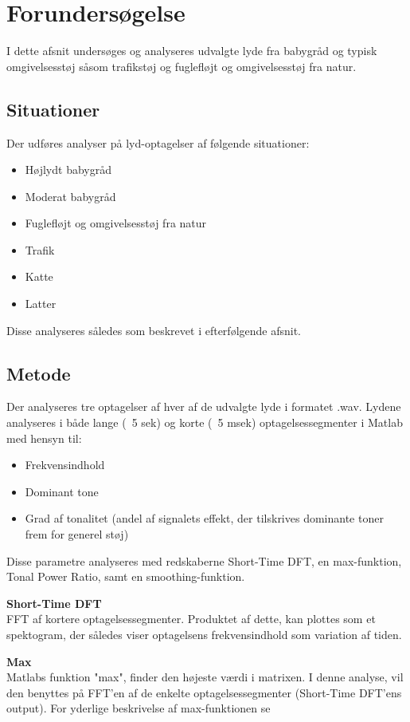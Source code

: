 \section{Forundersøgelse}

I dette afsnit undersøges og analyseres udvalgte lyde fra babygråd og typisk omgivelsesstøj såsom trafikstøj og fuglefløjt og omgivelsesstøj fra natur.

\subsection*{Situationer}
Der udføres analyser på lyd-optagelser af følgende situationer:
\begin{itemize}
	\item Højlydt babygråd
	\item Moderat babygråd
	\item Fuglefløjt og omgivelsesstøj fra natur
	\item Trafik
	\item Katte
	\item Latter 
\end{itemize} 
Disse analyseres således som beskrevet i efterfølgende afsnit.

\subsection*{Metode}
Der analyseres tre optagelser af hver af de udvalgte lyde i formatet .wav. Lydene analyseres i både lange (~5 sek) og korte (~5 msek) optagelsessegmenter i Matlab med hensyn til:
\begin{itemize}
	\item Frekvensindhold
	\item Dominant tone
	\item Grad af tonalitet (andel af signalets effekt, der tilskrives dominante toner frem for generel støj) 
\end{itemize} 

Disse parametre analyseres med redskaberne Short-Time DFT, en max-funktion, Tonal Power Ratio, samt en smoothing-funktion.

\textbf{Short-Time DFT} \\
FFT af kortere optagelsessegmenter. Produktet af dette, kan plottes som et spektogram, der således viser optagelsens frekvensindhold som variation af tiden.

\textbf{Max} \\
Matlabs funktion "max", finder den højeste værdi i matrixen. I denne analyse, vil den benyttes på FFT'en af de enkelte optagelsessegmenter (Short-Time DFT'ens output). For yderlige beskrivelse af max-funktionen se \citep{website:max}

